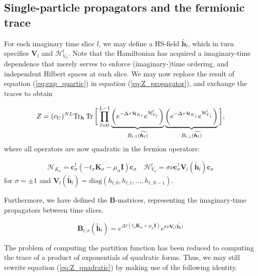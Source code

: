 \subsection{Single-particle propagators and the fermionic trace}\label{subsec:fermiontrace}

For each imaginary time slice $l$, we may define a HS-field $\widetilde{\bm h_l}$, which in turn specifies $\bm V_l$ and $\mathcal{H}_{V_\sigma}^l$.
Note that the Hamiltonian has acquired a  imaginary-time dependence that merely serves to enforce (imaginary-)time ordering, and independent Hilbert spaces at each slice.
We may now replace the result of equation (\ref{eq:exp_quartic}) in equation (\ref{eq:Z_propagator}), and exchange the traces to obtain

\begin{equation}\label{eq:Z_quadratic}
Z  = (c_U)^{NL} \text{Tr}_{\bm h} \operatorname{Tr} \bigg[ \prod_{l=0}^{L-1} \underbrace{\bigg( e^{-\Delta\tau  \mathcal{H}_{K_\uparrow}} e^{\mathcal{H}_{V_\uparrow}^l} \bigg)}_{B_{l, \uparrow}(\widetilde{\bm h_l)}} \underbrace{\bigg( e^{-\Delta\tau  \mathcal{H}_{K_\downarrow}} e^{\mathcal{H}_{V_\downarrow}^l} \bigg)}_{B_{l, \downarrow}(\widetilde{\bm h_l)}} \bigg] ,
\end{equation}
where all operators are now quadratic in the fermion operators:

\begin{equation}
\mathcal{H}_{K_\sigma} = \bm c_\sigma^\dagger ( - t_\sigma \bm K_\sigma -\mu_\sigma \bm I ) \bm c_\sigma \quad \mathcal{H}_{V_\sigma}^l = \sigma \nu \bm c_\sigma^\dagger \bm V_l (\widetilde{\bm h_l}) \bm c_\sigma
\end{equation}
for $\sigma = \pm 1$ and $\bm V_l ( \widetilde{\bm h_l} ) = \text{diag} ( h_{l, 0} , h_{l, 1}, ... , h_{l, N-1} )$.

Furthermore, we have defined the $\bm B$-matrices, representing the imaginary-time propagators between time slices.

\begin{equation}
\bm B_{l, \sigma} ( \widetilde{\bm h}_l ) = e^{\Delta \tau ( t_\sigma \bm K_\sigma + \mu_\sigma \bm I)} e^{\sigma \nu \bm V_l (\widetilde{\bm h_l)}}
\end{equation}

The problem of computing the partition function has been reduced to computing the trace of a product of exponentials of quadratic forms.
Thus, we may still rewrite equation (\ref{eq:Z_quadratic}) by making use of the following identity.


